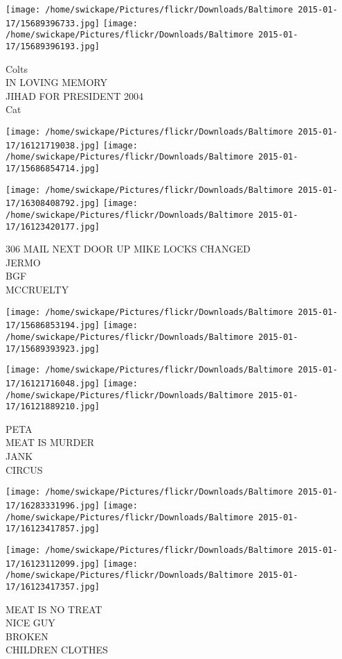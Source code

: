 \documentclass[10pt,letterpaper]{article}
\begin{document}
\texttt{[image: /home/swickape/Pictures/flickr/Downloads/Baltimore 2015-01-17/15689396733.jpg]}
\texttt{[image: /home/swickape/Pictures/flickr/Downloads/Baltimore 2015-01-17/15689396193.jpg]}

Colts\\
IN LOVING MEMORY\\
JIHAD FOR PRESIDENT 2004\\
Cat
\pagebreak

\texttt{[image: /home/swickape/Pictures/flickr/Downloads/Baltimore 2015-01-17/16121719038.jpg]}
\texttt{[image: /home/swickape/Pictures/flickr/Downloads/Baltimore 2015-01-17/15686854714.jpg]}

\texttt{[image: /home/swickape/Pictures/flickr/Downloads/Baltimore 2015-01-17/16308408792.jpg]}
\texttt{[image: /home/swickape/Pictures/flickr/Downloads/Baltimore 2015-01-17/16123420177.jpg]}

306 MAIL NEXT DOOR UP MIKE LOCKS CHANGED\\
JERMO\\
BGF\\
MCCRUELTY
\pagebreak

\texttt{[image: /home/swickape/Pictures/flickr/Downloads/Baltimore 2015-01-17/15686853194.jpg]}
\texttt{[image: /home/swickape/Pictures/flickr/Downloads/Baltimore 2015-01-17/15689393923.jpg]}

\texttt{[image: /home/swickape/Pictures/flickr/Downloads/Baltimore 2015-01-17/16121716048.jpg]}
\texttt{[image: /home/swickape/Pictures/flickr/Downloads/Baltimore 2015-01-17/16121889210.jpg]}

PETA\\
MEAT IS MURDER\\
JANK\\
CIRCUS
\pagebreak

\texttt{[image: /home/swickape/Pictures/flickr/Downloads/Baltimore 2015-01-17/16283331996.jpg]}
\texttt{[image: /home/swickape/Pictures/flickr/Downloads/Baltimore 2015-01-17/16123417857.jpg]}

\texttt{[image: /home/swickape/Pictures/flickr/Downloads/Baltimore 2015-01-17/16123112099.jpg]}
\texttt{[image: /home/swickape/Pictures/flickr/Downloads/Baltimore 2015-01-17/16123417357.jpg]}

MEAT IS NO TREAT\\
NICE GUY\\
BROKEN\\
CHILDREN CLOTHES
\pagebreak
\end{document}
